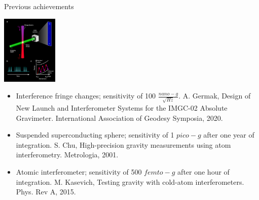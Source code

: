 \documentclass{beamer}
\begin{document}
\begin{frame}{Previous achievements}
	\begin{center}		
		\includegraphics[width=0.2\textwidth,keepaspectratio]{kasevich.png}
	\end{center}
	\begin{itemize}

		\item Interference fringe changes; sensitivity of 100 $\frac{nano-g}{\sqrt{Hz}}$. 
		\fontsize{7}{11}\selectfont
		A. Germak, Design of New Launch and Interferometer Systems for the IMGC-02 Absolute Gravimeter. International Association of Geodesy Symposia, 2020. 
		\normalsize
		\item Suspended superconducting sphere; sensitivity of 1 $pico-g$ after one year of integration.
		\fontsize{7}{11}\selectfont
		S. Chu, High-precision gravity measurements using atom interferometry. Metrologia, 2001.
		\normalsize
		\item Atomic interferometer; sensitivity of 500 $femto-g$ after one hour of integration.
		\fontsize{7}{11}\selectfont
		M. Kasevich, Testing gravity with cold-atom interferometers. Phys. Rev A, 2015.
		\normalsize


		
	\end{itemize}
\end{frame}
\end{document}

